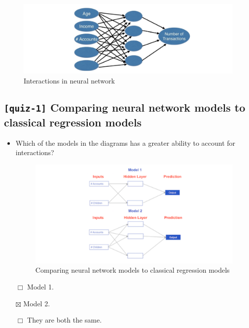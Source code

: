 \documentclass[11pt, twoside]{article}
\begin{document}
\begin{figure}
\centering
\includegraphics{../Figures/2. Interactions in neural network.jpg}
\caption{Interactions in neural network}
\end{figure}

    \hypertarget{quiz-1-comparing-neural-network-models-to-classical-regression-models}{%
\subsection{\texorpdfstring{\texttt{{[}quiz-1{]}} Comparing neural
network models to classical regression
models}{{[}quiz-1{]} Comparing neural network models to classical regression models}}\label{quiz-1-comparing-neural-network-models-to-classical-regression-models}}

\begin{itemize}
\item
  Which of the models in the diagrams has a greater ability to account
  for interactions?

  \begin{figure}
  \centering
  \includegraphics{../Figures/3. Comparing neural network models to classical regression models.png}
  \caption{Comparing neural network models to classical regression
  models}
  \end{figure}

  \(\Box\) Model 1.

  \(\boxtimes\) Model 2.

  \(\Box\) They are both the same.
\end{itemize}
\end{document}
